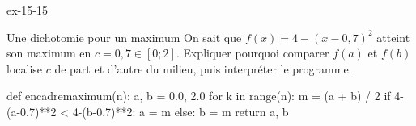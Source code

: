 \begin{blocLivre}{ex-15-15}
\begin{exercice}[3]{Une dichotomie pour un maximum}
On sait que $f(x)=4-(x-0{,}7)^2$ atteint son maximum en $c=0{,}7\in[0;2]$. Expliquer pourquoi comparer $f(a)$ et $f(b)$ localise $c$ de part et d’autre du milieu, puis interpréter le programme.
\begin{python}
def encadremaximum(n):
    a, b = 0.0, 2.0
    for k in range(n):
        m = (a + b) / 2
        if 4-(a-0.7)**2 < 4-(b-0.7)**2:
            a = m
        else:
            b = m
    return a, b
\end{python}
\end{exercice}
\end{blocLivre}

\clearpage
